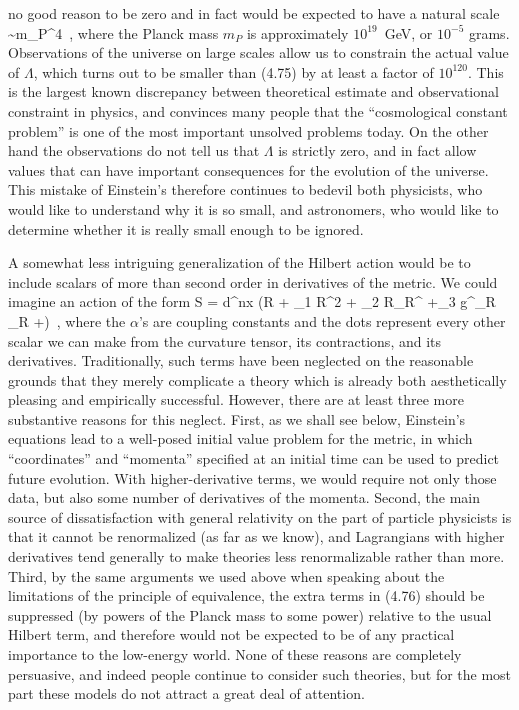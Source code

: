 \documentclass[12pt]{article}
\begin{document}
no good reason to be zero and in fact would be expected to have
a natural scale
\be
  \Lambda \sim m_P^4\ ,\label{4.75}
\ee
where the Planck mass $m_P$ is approximately $10^{19}$~GeV, or
$10^{-5}$ grams.  Observations of the universe on large scales 
allow us to constrain the actual value of $\Lambda$, which turns
out to be smaller than (4.75) by at least a factor of $10^{120}$.
This is the largest known discrepancy between theoretical estimate
and observational constraint in physics, and convinces many people
that the ``cosmological constant problem'' is one of the most
important unsolved problems today.  On the other hand the 
observations do not tell us that $\Lambda$ is strictly zero, and
in fact allow values that can have important consequences for the
evolution of the universe.  This mistake of Einstein's therefore
continues to bedevil both physicists, who would like to understand
why it is so small, and astronomers, who would like to determine
whether it is really small enough to be ignored.

A somewhat less intriguing generalization of the Hilbert action would
be to include scalars of more than second order in derivatives of
the metric.  We could imagine an action of the form
\be
  S = \int d^nx \g (R + \alpha_1 R^2 + \alpha_2 R_\mn R^\mn
  +\alpha_3 g^\mn \nabla_\mu R \nabla_\nu R +\cdots)\ ,\label{4.76}
\ee
where the $\alpha$'s are coupling constants and the dots represent
every other scalar we can make from the curvature tensor, its 
contractions, and its derivatives.  Traditionally, such terms have
been neglected on the reasonable grounds that they merely complicate
a theory which is already both aesthetically pleasing and empirically
successful.  However, there are at least three more substantive reasons 
for this neglect.  First, as we shall see below, Einstein's equations
lead to a well-posed initial value problem for the metric, in which
``coordinates'' and ``momenta'' specified at an initial time can be
used to predict future evolution.  With higher-derivative terms, we
would require not only those data, but also some number of derivatives
of the momenta.  Second, the main source of dissatisfaction with 
general relativity on the part of particle physicists is that it cannot
be renormalized (as far as we know), and Lagrangians with higher 
derivatives tend generally to make theories less renormalizable rather
than more.  Third, by the same arguments we used above when speaking
about the limitations of the principle of equivalence, the extra terms
in (4.76) should be suppressed (by powers of the Planck mass to some
power) relative to the usual Hilbert term, and therefore would not be
expected to be of any practical importance to the low-energy world.
None of these reasons are completely persuasive, and indeed people
continue to consider such theories, but for the most part these models
do not attract a great deal of attention.
\end{document}
